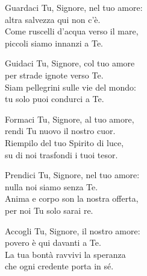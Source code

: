 

\spazio

\strofa Guardaci Tu, Signore, nel tuo amore:\\
altra salvezza qui non c'è.\\
Come ruscelli d'acqua verso il mare,\\
piccoli siamo innanzi a Te.

\spazio


\spazio

\strofa Guidaci Tu, Signore, col tuo amore\\
per strade ignote verso Te.\\
Siam pellegrini sulle vie del mondo:\\
tu solo puoi condurci a Te.

\spazio


\spazio

\strofa Formaci Tu, Signore, al tuo amore,\\
rendi Tu nuovo il nostro cuor.\\
Riempilo del tuo Spirito di luce,\\
su di noi trasfondi i tuoi tesor.

\spazio


\spazio

\strofa Prendici Tu, Signore, nel tuo amore:\\
nulla noi siamo senza Te.\\
Anima e corpo son la nostra offerta,\\
per noi Tu solo sarai re.

\spazio


\spazio

\strofa Accogli Tu, Signore, il nostro amore:\\
povero è qui davanti a Te.\\
La tua bontà ravvivi la speranza\\
che ogni credente porta in sé.

\spazio


